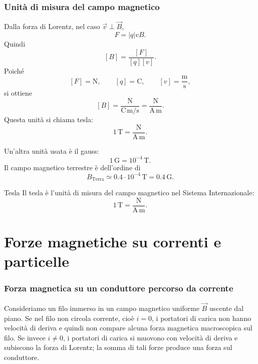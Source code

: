 \documentclass[a4paper]{article}
\begin{document}
\section{Unità di misura del campo magnetico}

Dalla forza di Lorentz, nel caso \(\vec{v}\perp\vec{B}\),
\[
    F=|q|vB.
\]
Quindi
\[
    [B]=\frac{[F]}{[q][v]}.
\]
Poiché
\[
    [F]=\mathrm{N},
    \qquad
    [q]=\mathrm{C},
    \qquad
    [v]=\frac{\mathrm{m}}{\mathrm{s}},
\]
si ottiene
\[
    [B]=\frac{\mathrm{N}}{\mathrm{C}\,\mathrm{m/s} }
    =\frac{\mathrm{N}}{\mathrm{A}\,\mathrm{m}}.
\]
Questa unità si chiama tesla:
\[
    1\,\mathrm{T}=\frac{\mathrm{N}}{\mathrm{A}\,\mathrm{m}}.
\]

Un'altra unità usata è il gauss:
\[
    1\,\mathrm{G}=10^{-4}\,\mathrm{T}.
\]
Il campo magnetico terrestre è dell'ordine di
\[
    B_{\text{Terra}}\simeq 0.4\cdot 10^{-4}\,\mathrm{T}=0.4\,\mathrm{G}.
\]

\begin{snippetdefinition}{Tesla}
    Il tesla è l'unità di misura del campo magnetico nel Sistema Internazionale:
    \[
        1\,\mathrm{T}=\frac{\mathrm{N}}{\mathrm{A}\,\mathrm{m}}.
    \]
\end{snippetdefinition}

\pagebreak
\part{Forze magnetiche su correnti e particelle}

\section{Forza magnetica su un conduttore percorso da corrente}

Consideriamo un filo immerso in un campo magnetico uniforme \(\vec{B}\) uscente dal piano. Se nel filo non circola corrente, cioè \(i=0\), i portatori di carica non hanno velocità di deriva e quindi non compare alcuna forza magnetica macroscopica sul filo. Se invece \(i\neq 0\), i portatori di carica si muovono con velocità di deriva e subiscono la forza di Lorentz; la somma di tali forze produce una forza sul conduttore.

\begin{center}
\end{center}
\end{document}
